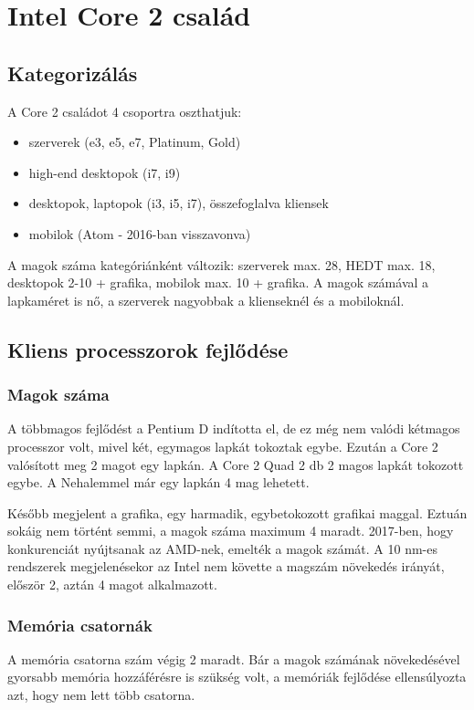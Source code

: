 
\chapter{Intel Core 2 család}

\section{Kategorizálás}
A Core 2 családot 4 csoportra oszthatjuk:
\begin{itemize}
    \item szerverek (e3, e5, e7, Platinum, Gold)
    \item high-end desktopok (i7, i9)
    \item desktopok, laptopok (i3, i5, i7), összefoglalva kliensek
    \item mobilok (Atom - 2016-ban visszavonva)
\end{itemize}

A magok száma kategóriánként változik: szerverek max. 28, HEDT max. 18, desktopok 2-10 + grafika, mobilok max. 10 + grafika.
A magok számával a lapkaméret is nő, a szerverek nagyobbak a klienseknél és a mobiloknál.

\section{Kliens processzorok fejlődése}
\subsection{Magok száma}
A többmagos fejlődést a Pentium D indította el, de ez még nem valódi kétmagos processzor volt, mivel két, egymagos lapkát tokoztak egybe.
Ezután a Core 2 valósított meg 2 magot egy lapkán.
A Core 2 Quad 2 db 2 magos lapkát tokozott egybe.
A Nehalemmel már egy lapkán 4 mag lehetett.

Később megjelent a grafika, egy harmadik, egybetokozott grafikai maggal.
Eztuán sokáig nem történt semmi, a magok száma maximum 4 maradt.
2017-ben, hogy konkurenciát nyújtsanak az AMD-nek, emelték a magok számát.
A 10 nm-es rendszerek megjelenésekor az Intel nem követte a magszám növekedés irányát, először 2, aztán 4 magot alkalmazott.

\subsection{Memória csatornák}
A memória csatorna szám végig 2 maradt.
Bár a magok számának növekedésével gyorsabb memória hozzáférésre is szükség volt, a memóriák fejlődése ellensúlyozta azt, hogy nem lett több csatorna.


